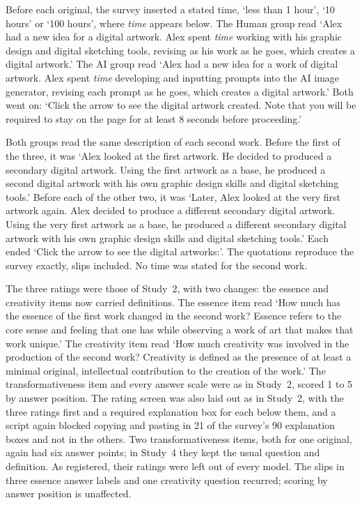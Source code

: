 Before each original, the survey inserted a stated time, `less than 1 hour', `10 hours' or `100 hours', where \textit{time} appears below. The Human group read `Alex had a new idea for a digital artwork. Alex spent \textit{time} working with his graphic design and digital sketching tools, revising as his work as he goes, which creates a digital artwork.' The AI group read `Alex had a new idea for a work of digital artwork. Alex spent \textit{time} developing and inputting prompts into the AI image generator, revising each prompt as he goes, which creates a digital artwork.' Both went on: `Click the arrow to see the digital artwork created. Note that you will be required to stay on the page for at least 8 seconds before proceeding.'

Both groups read the same description of each second work. Before the first of the three, it was `Alex looked at the first artwork. He decided to produced a secondary digital artwork. Using the first artwork as a base, he produced a second digital artwork with his own graphic design skills and digital sketching tools.' Before each of the other two, it was `Later, Alex looked at the very first artwork again. Alex decided to produce a different secondary digital artwork. Using the very first artwork as a base, he produced a different secondary digital artwork with his own graphic design skills and digital sketching tools.' Each ended `Click the arrow to see the digital artworks:'. The quotations reproduce the survey exactly, slips included. No time was stated for the second work.

The three ratings were those of Study~2, with two changes: the essence and creativity items now carried definitions. The essence item read `How much has the essence of the first work changed in the second work? Essence refers to the core sense and feeling that one has while observing a work of art that makes that work unique.' The creativity item read `How much creativity was involved in the production of the second work? Creativity is defined as the presence of at least a minimal original, intellectual contribution to the creation of the work.' The transformativeness item and every answer scale were as in Study~2, scored 1 to 5 by answer position. The rating screen was also laid out as in Study~2, with the three ratings first and a required explanation box for each below them, and a script again blocked copying and pasting in 21 of the survey's 90 explanation boxes and not in the others. Two transformativeness items, both for one original, again had six answer points; in Study~4 they kept the usual question and definition. As registered, their \SFourNSixPointDropped{} ratings were left out of every model. The slips in three essence answer labels and one creativity question recurred; scoring by answer position is unaffected.

